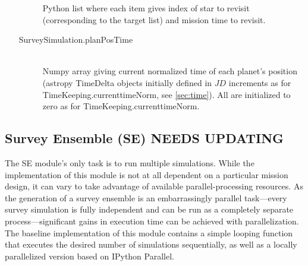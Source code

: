 \documentclass[cleanfoot]{asme2ej}
\begin{document}
\begin{itemize}
\begin{description}
        Python list where each item gives index of star to revisit (corresponding to the target list) and mission time to revisit.
        \item[SurveySimulation.planPosTime] \hfill \\
        Numpy array giving current normalized time of each planet's position (astropy TimeDelta objects initially defined in $ JD $ increments as for TimeKeeping.currenttimeNorm, see \ref{sec:time}). All are initialized to zero as for TimeKeeping.currenttimeNorm. 
    \end{description}
\end{itemize}


\subsection{Survey Ensemble (SE) NEEDS UPDATING}
The SE module's only task is to run multiple simulations.  While the implementation of this module is not at all dependent on a particular mission design, it can vary to take advantage of available parallel-processing resources.  As the generation of a survey ensemble is an embarrassingly parallel task---every survey simulation is fully independent and can be run as a completely separate process---significant gains in execution time can be achieved with parallelization.  The baseline implementation of this module contains a simple looping function that executes the desired number of simulations sequentially, as well as a locally parallelized version based on IPython Parallel.
\end{document}
